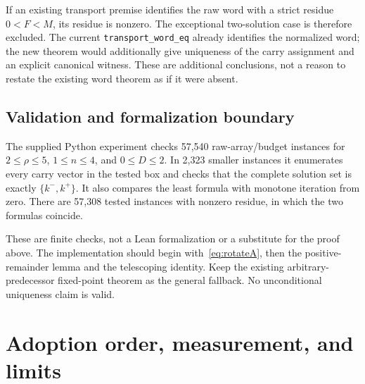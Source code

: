 \documentclass[11pt]{article}
\theoremstyle{remark}\newtheorem{remark}[theorem]{Remark}
\newcommand{\code}[1]{\nolinkurl{#1}}
\begin{document}
If an existing transport premise identifies the raw word with a strict residue \(0<F<M\), its residue is nonzero. The exceptional two-solution case is therefore excluded. The current \code{transport_word_eq} already identifies the normalized word; the new theorem would additionally give uniqueness of the carry assignment and an explicit canonical witness. These are additional conclusions, not a reason to restate the existing word theorem as if it were absent.

\subsection{Validation and formalization boundary}

The supplied Python experiment checks 57,540 raw-array/budget instances for \(2\le\rho\le5\), \(1\le n\le4\), and \(0\le D\le2\). In 2,323 smaller instances it enumerates every carry vector in the tested box and checks that the complete solution set is exactly \(\{k^-,k^+\}\). It also compares the least formula with monotone iteration from zero. There are 57,308 tested instances with nonzero residue, in which the two formulas coincide.

These are finite checks, not a Lean formalization or a substitute for the proof above. The implementation should begin with~\eqref{eq:rotateA}, then the positive-remainder lemma and the telescoping identity. Keep the existing arbitrary-predecessor fixed-point theorem as the general fallback. No unconditional uniqueness claim is valid.

\section{Adoption order, measurement, and limits}
\end{document}
